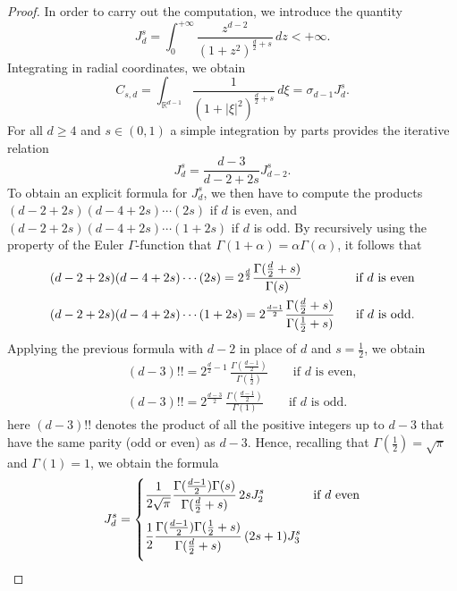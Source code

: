 \documentclass[11pt]{article}
\begin{document}
\begin{proof}
In order to carry out the computation, we introduce the quantity
$$J_d^s=\int_0^{+\infty}\frac{z^{d-2}}{(1+z^2)^{\frac{d}{2}+s}}\, dz< +\infty.$$
Integrating in radial coordinates, we obtain
\begin{equation*}%
C_{s,d}=\int_{\mathbb R^{d-1}}
\frac{1}{(1+|\xi|^2)^{\frac{d}{2}+s}}\, d\xi = \sigma_{d-1}J_d^s. 
\end{equation*}
For all $d\geq 4$ and $s\in(0,1)$ a simple integration by parts provides the iterative relation 
\begin{equation}
\label{iterj}
J^s_d=\frac{d-3}{d-2+2s}J^s_{d-2}.
\end{equation}
To obtain an explicit formula for $J^s_d$, we then have to compute the products $(d-2+2s)(d-4+2s)
\cdots(2s)$ if $d$ is even, and $(d-2+2s)(d-4+2s)\cdots(1+2s)$ if $d$ is odd. By recursively using the property of the Euler $\Gamma$-function that $\Gamma(1+\alpha)=\alpha\Gamma(\alpha)$, 
it follows that 
\begin{eqnarray*}
&(d-2+2s)(d-4+2s)\cdots(2s)=2^{\frac{d}{2}} \frac{\Gamma(\frac{d}{2}+s)}{\Gamma(s)} & \hbox{\rm if $d$ is even}\\
&(d-2+2s)(d-4+2s)\cdots(1+2s)=2^{\frac{d-1}{2}} \frac{\Gamma(\frac{d}{2}+s)}{\Gamma(\frac{1}{2}+s)}\ \  & \hbox{\rm if $d$ is odd}.
\end{eqnarray*} 
Applying the previous formula with $d-2$ in place of $d$ and $s=\frac{1}{2}$, we obtain
\begin{eqnarray*}
&&(d-3)!! = 2^{\frac{d}{2}-1}\,
\frac{\Gamma\!\left(\frac{d-1}{2}\right)}{\Gamma\!\left(\frac{1}{2}\right)}
\qquad \text{if $d$ is even}, \\[6pt]
&&(d-3)!! = 2^{\frac{d-3}{2}}\,
\frac{\Gamma\!\left(\frac{d-1}{2}\right)}{\Gamma(1)}
\qquad \text{if $d$ is odd}.
\end{eqnarray*}
here $(d-3)!!$ denotes the product of all the positive integers up to $d-3$ that have the same parity (odd or even) as $d-3$.
Hence, recalling that $\Gamma(\frac{1}{2})=\sqrt{\pi}$ and $\Gamma(1)=1$, we obtain the formula
\begin{equation}\label{jds}\nonumber
J_d^s=\begin{cases}
\vspace{2mm}
\displaystyle 
\frac{1}{2\sqrt{\pi}}
\frac{\Gamma(\frac{d-1}{2})
\Gamma(s)}{\Gamma(\frac{d}{2}+s)}\, 2s J^s_2 & \hbox{\rm if $d$ even}\\
\vspace{2mm}
\displaystyle \frac{1}{2}\frac{\Gamma(\frac{d-1}{2})\Gamma(\frac{1}{2}+s)}{\Gamma(\frac{d}{2}+s)}\, (2s+1) J^s_3

\end{cases}
\end{equation}
\end{proof}
\end{document}
